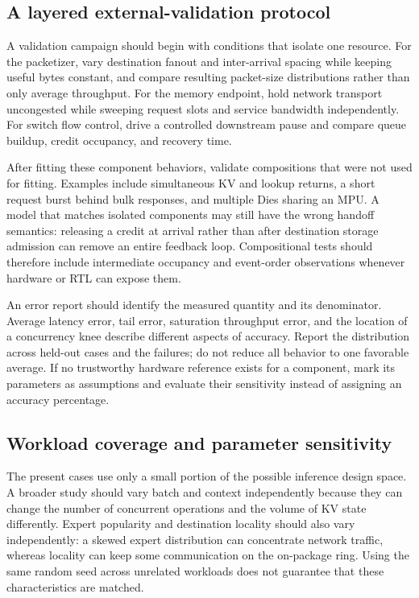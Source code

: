 \subsection{A layered external-validation protocol}
A validation campaign should begin with conditions that isolate one resource. For the packetizer, vary destination fanout and inter-arrival spacing while keeping useful bytes constant, and compare resulting packet-size distributions rather than only average throughput. For the memory endpoint, hold network transport uncongested while sweeping request slots and service bandwidth independently. For switch flow control, drive a controlled downstream pause and compare queue buildup, credit occupancy, and recovery time.

After fitting these component behaviors, validate compositions that were not used for fitting. Examples include simultaneous KV and lookup returns, a short request burst behind bulk responses, and multiple Dies sharing an MPU. A model that matches isolated components may still have the wrong handoff semantics: releasing a credit at arrival rather than after destination storage admission can remove an entire feedback loop. Compositional tests should therefore include intermediate occupancy and event-order observations whenever hardware or RTL can expose them.

An error report should identify the measured quantity and its denominator. Average latency error, tail error, saturation throughput error, and the location of a concurrency knee describe different aspects of accuracy. Report the distribution across held-out cases and the failures; do not reduce all behavior to one favorable average. If no trustworthy hardware reference exists for a component, mark its parameters as assumptions and evaluate their sensitivity instead of assigning an accuracy percentage.

\subsection{Workload coverage and parameter sensitivity}
The present cases use only a small portion of the possible inference design space. A broader study should vary batch and context independently because they can change the number of concurrent operations and the volume of KV state differently. Expert popularity and destination locality should also vary independently: a skewed expert distribution can concentrate network traffic, whereas locality can keep some communication on the on-package ring. Using the same random seed across unrelated workloads does not guarantee that these characteristics are matched.

